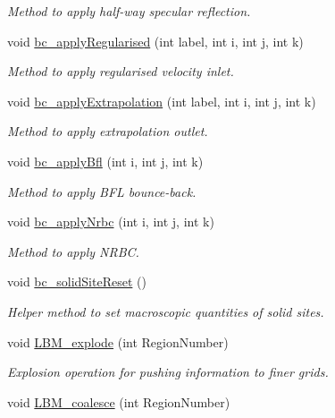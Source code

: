 \begin{DoxyCompactItemize}
\begin{DoxyCompactList}\small\item\em Method to apply half-\/way specular reflection. \end{DoxyCompactList}\item 
void \hyperlink{class_grid_obj_a5602705b2575b09e27dd0065de3542f6}{bc\+\_\+apply\+Regularised} (int label, int i, int j, int k)
\begin{DoxyCompactList}\small\item\em Method to apply regularised velocity inlet. \end{DoxyCompactList}\item 
void \hyperlink{class_grid_obj_a385c4803f4803e380a520ac9b3dcb31d}{bc\+\_\+apply\+Extrapolation} (int label, int i, int j, int k)
\begin{DoxyCompactList}\small\item\em Method to apply extrapolation outlet. \end{DoxyCompactList}\item 
void \hyperlink{class_grid_obj_aeff3b54617b7ae65f08c96e653f9035f}{bc\+\_\+apply\+Bfl} (int i, int j, int k)
\begin{DoxyCompactList}\small\item\em Method to apply B\+FL bounce-\/back. \end{DoxyCompactList}\item 
void \hyperlink{class_grid_obj_ae4fd999e7334c8ec8e1118c92e0c7338}{bc\+\_\+apply\+Nrbc} (int i, int j, int k)
\begin{DoxyCompactList}\small\item\em Method to apply N\+R\+BC. \end{DoxyCompactList}\item 
void \hyperlink{class_grid_obj_ac86a233f9475084226e6bf651ffe398f}{bc\+\_\+solid\+Site\+Reset} ()
\begin{DoxyCompactList}\small\item\em Helper method to set macroscopic quantities of solid sites. \end{DoxyCompactList}\item 
void \hyperlink{class_grid_obj_ad8086651bd7b978e0b9c48d56c3d0595}{L\+B\+M\+\_\+explode} (int Region\+Number)
\begin{DoxyCompactList}\small\item\em Explosion operation for pushing information to finer grids. \end{DoxyCompactList}\item 
void \hyperlink{class_grid_obj_a5832081a70e8990be62317034bb975c6}{L\+B\+M\+\_\+coalesce} (int Region\+Number)

\end{DoxyCompactItemize}
